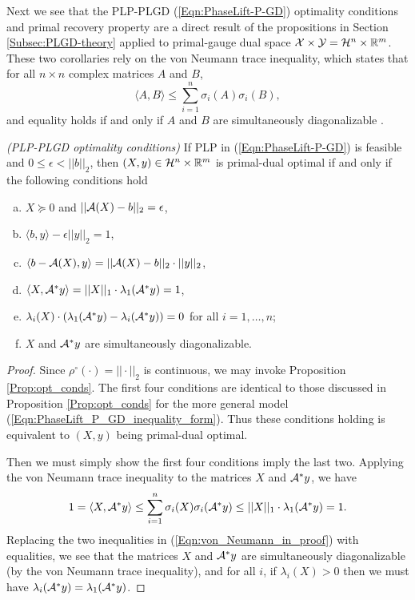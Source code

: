 Next we see that the PLP-PLGD (\ref{Eqn:PhaseLift-P-GD}) optimality conditions and primal recovery property are a direct result of the propositions in Section \ref{Subsec:PLGD-theory} applied to primal-gauge dual space ${\mathcal X} \times {\mathcal Y} = {\mathcal H}^n \times {\mathbb R}^m$.  These two corollaries rely on the von Neumann trace inequality, which states that for all $n \times n$ complex matrices $A$ and $B$,
\begin{equation}			\label{Eqn:von_Neumann_trace_inequality}
\langle A, B \rangle \leq \sum_{i=1}^n \sigma_i(A) \sigma_i(B),
\end{equation}
and equality holds if and only if $A$ and $B$ are simultaneously diagonalizable \cite{grigorieff1991note}.

\begin{cor} 		\label{Cor:PLGD-optimality}
\emph{(PLP-PLGD optimality conditions)}
If PLP in (\ref{Eqn:PhaseLift-P-GD}) is feasible and $0 \leq \epsilon < ||b||_2$, then $(X, y) \in {\mathcal H}^n \times {\mathbb R}^m$ is primal-dual optimal if and only if the following conditions hold
\begin{enumerate}[(a)]
\item
$X \succeq 0$ and $||{\mathcal A}(X) -b||_2=\epsilon$,

\item
$\langle b, y \rangle - \epsilon ||y||_2 = 1$,

\item
$\langle b - {\mathcal A}(X), y \rangle = ||{\mathcal A}(X)-b||_2 \cdot ||y||_2$,

\item
$\langle X, {\mathcal A}^*y \rangle = ||X||_1 \cdot \lambda_1({\mathcal A}^*y) = 1$,

\item
$\lambda_i(X) \cdot \left( \lambda_1({\mathcal A}^* y) - \lambda_i ({\mathcal A}^* y)  \right) = 0$ for all $i = 1, \ldots, n$;

\item
$X$ and ${\mathcal A}^*y$ are simultaneously diagonalizable.
\end{enumerate}
\end{cor}
\begin{proof}
Since $\rho^\circ(\cdot) = ||\cdot||_2$ is continuous, we may invoke Proposition \ref{Prop:opt_conds}. The first four conditions are identical to those discussed in Proposition \ref{Prop:opt_conds} for the more general model (\ref{Eqn:PhaseLift_P_GD_inequality_form}).  Thus these conditions holding is equivalent to $(X,y)$ being primal-dual optimal.

Then we must simply show the first four conditions imply the last two.    Applying the von Neumann trace inequality to the matrices $X$ and ${\mathcal A}^*y$, we have
\begin{equation}		\label{Eqn:von_Neumann_in_proof}
1 = \langle X, {\mathcal A}^*y \rangle \leq \sum_{i=1}^n \sigma_i(X) \sigma_i({\mathcal A}^*y) \leq ||X||_1 \cdot \lambda_1({\mathcal A}^*y) = 1.
\end{equation}
Replacing the two inequalities in (\ref{Eqn:von_Neumann_in_proof}) with equalities, we see that the matrices $X$ and ${\mathcal A}^*y$ are simultaneously diagonalizable (by the von Neumann trace inequality), and for all $i$, if $\lambda_i(X) > 0$ then we must have $\lambda_i({\mathcal A}^*y) = \lambda_1({\mathcal A}^*y)$.
\end{proof}
